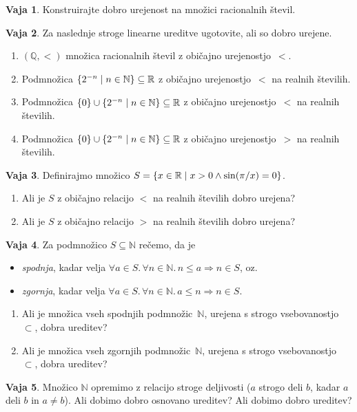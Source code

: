 \documentclass{article}
\newcommand{\all}[1]{\forall #1 .\,}
\newcommand{\lthen}{\Rightarrow}
\newcommand{\NN}{\mathbb{N}}
\newcommand{\QQ}{\mathbb{Q}}
\newcommand{\RR}{\mathbb{R}}
\theoremstyle{definition}
\newtheorem{vaja}{Vaja}
\begin{document}
\begin{vaja}
  Konstruirajte dobro urejenost na množici racionalnih števil.
\end{vaja}

\begin{vaja}
  Za naslednje stroge linearne ureditve ugotovite, ali so dobro urejene.
  \begin{enumerate}
    \item
      $(\QQ, <)$ množica racionalnih števil z običajno urejenostjo~$<$.
    \item
      Podmnožica $\set{2^{-n}}{n \in \NN} \subseteq \RR$ z običajno urejenostjo~$<$ na realnih številih.
    \item
      Podmnožica $\set{0} \cup \set{2^{-n}}{n \in \NN} \subseteq \RR$ z običajno urejenostjo~$<$ na realnih številih.
    \item
      Podmnožica $\set{0} \cup \set{2^{-n}}{n \in \NN} \subseteq \RR$ z običajno urejenostjo~$>$ na realnih številih.
  \end{enumerate}
\end{vaja}

\begin{vaja}
  Definirajmo množico $S = \set{x \in \RR}{x > 0 \land \sin(\pi/x) = 0}$.
  \begin{enumerate}
    \item Ali je $S$ z običajno relacijo $<$ na realnih številih dobro urejena?
    \item Ali je $S$ z običajno relacijo $>$ na realnih številih dobro urejena?
  \end{enumerate}
\end{vaja}

\begin{vaja}
  Za podmnožico $S \subseteq \NN$ rečemo, da je
  \begin{itemize}
    \item
      \emph{spodnja}, kadar velja $\all{a \in S}\all{n \in \NN}{n \leq a \lthen n \in S}$, oz.
    \item
      \emph{zgornja}, kadar velja $\all{a \in S}\all{n \in \NN}{a \leq n \lthen n \in S}$.
  \end{itemize}
  \begin{enumerate}
    \item
      Ali je množica vseh spodnjih podmnožic~$\NN$, urejena s strogo vsebovanostjo~$\subset$, dobra ureditev?
    \item
      Ali je množica vseh zgornjih podmnožic~$\NN$, urejena s strogo vsebovanostjo~$\subset$, dobra ureditev?
  \end{enumerate}
\end{vaja}

\begin{vaja}
  Množico $\NN$ opremimo z relacijo stroge deljivosti ($a$ strogo deli $b$, kadar $a$ deli $b$ in $a \neq b$). Ali dobimo dobro osnovano ureditev? Ali dobimo dobro ureditev?
\end{vaja}
\end{document}
